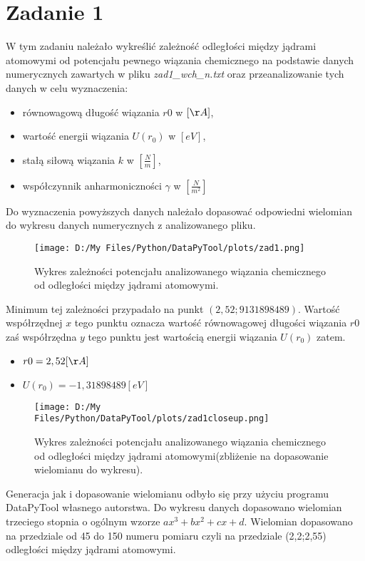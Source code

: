 \documentclass[12pt,a4paper]{article}
\begin{document}
\section*{Zadanie 1}
W tym zadaniu należało wykreślić zależność odległości między jądrami atomowymi od potencjału pewnego wiązania chemicznego na podstawie danych numerycznych zawartych w pliku \textit{zad1_wch_n.txt} oraz przeanalizowanie tych danych w celu wyznaczenia:
\begin{itemize}
\item równowagową długość wiązania $r0$ w $[\AA]$,
\item wartość energii wiązania $U(r_0)$ w $[eV]$,
\item stałą siłową wiązania $k$ w $[\frac{N}{m}]$,
\item współczynnik anharmoniczności $\gamma$ w $[\frac{N}{m^2}]$
\end{itemize}
Do wyznaczenia powyższych danych należało dopasować odpowiedni wielomian do wykresu danych numerycznych z analizowanego pliku.
\begin{figure}[H]
\centering
\texttt{[image: D:/My Files/Python/DataPyTool/plots/zad1.png]}
\vspace{-0,2cm}
\label{Wykres zależności potencjału analizowanego wiązania chemicznego od odległości między jądrami atomowymi.}
\caption{Wykres zależności potencjału analizowanego wiązania chemicznego od odległości między jądrami atomowymi.}
\end{figure}
Minimum tej zależności przypadało na punkt $(2,52;9131898489)$. Wartość współrzędnej $x$ tego punktu oznacza wartość równowagowej długości wiązania $r0$  zaś współrzędna $y$ tego punktu jest wartością energii wiązania $U(r_0)$ zatem.
\begin{itemize}
\item $r0 = 2,52 [\AA]$
\item $U(r_0) = -1,31898489 [eV]$
\end{itemize}
\begin{figure}[H]
\centering
\texttt{[image: D:/My Files/Python/DataPyTool/plots/zad1closeup.png]}
\vspace{-0,2cm}
\label{Wykres zależności potencjału analizowanego wiązania chemicznego od odległości między jądrami atomowymi (zbliżenie na dopasowanie wielomianu do wykresu).}
\caption{Wykres zależności potencjału analizowanego wiązania chemicznego od odległości między jądrami atomowymi(zbliżenie na dopasowanie wielomianu do wykresu).}
\end{figure}
Generacja jak i dopasowanie wielomianu odbyło się przy użyciu programu DataPyTool własnego autorstwa. Do wykresu danych dopasowano wielomian trzeciego stopnia o ogólnym wzorze $ax^3+bx^2+cx+d$. Wielomian dopasowano na przedziale od 45 do 150 numeru pomiaru czyli na przedziale (2,2;2,55) odległości między jądrami atomowymi.
\end{document}
